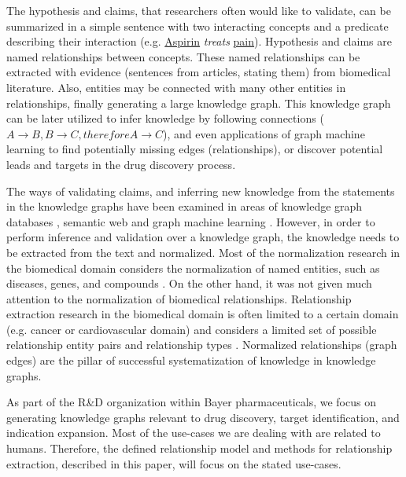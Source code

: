 \documentclass[final,12pt,3p,times,twocolumn,authoryear]{elsarticle}
\begin{document}
The hypothesis and claims, that researchers often would like to validate, can be summarized in a simple sentence with two interacting concepts and a predicate describing their interaction (e.g. \underline{Aspirin} \textit{treats} \underline{pain}). Hypothesis and claims are named relationships between concepts. These named relationships can be extracted with evidence (sentences from articles, stating them) from biomedical literature. Also, entities may be connected with many other entities in relationships, finally generating a large knowledge graph. This knowledge graph can be later utilized to infer knowledge by following connections ($A \rightarrow B, B \rightarrow C, therefore   A \rightarrow C$), and even applications of graph machine learning to find potentially missing edges (relationships), or discover potential leads and targets in the drug discovery process. 

The ways of validating claims, and inferring new knowledge from the statements in the knowledge graphs have been examined in areas of knowledge graph databases \citep{messina2017biograkn,miller2013graph}, semantic web \citep{mcguinness2004owl,parsia2004pellet,sirin2007pellet,shearer2008hermit} and graph machine learning \citep{scarselli2008graph,velivckovic2017graph,qu2019gmnn}. However, in order to perform inference and validation over a knowledge graph, the knowledge needs to be extracted from the text and normalized. Most of the normalization research in the biomedical domain considers the normalization of named entities, such as diseases, genes, and compounds \citep{cho2017method,ji2020bert,zhou2020knowledge}. On the other hand, it was not given much attention to the normalization of biomedical relationships. Relationship extraction research in the biomedical domain is often limited to a certain domain (e.g. cancer or cardiovascular domain) and considers a limited set of possible relationship entity pairs and relationship types \citep{rindflesch1999edgar,yang2021mining}. Normalized relationships (graph edges) are the pillar of successful systematization of knowledge in knowledge graphs.

As part of the R\&D organization within Bayer pharmaceuticals, we focus on generating knowledge graphs relevant to drug discovery, target identification, and indication expansion. Most of the use-cases we are dealing with are related to humans. Therefore, the defined relationship model and methods for relationship extraction, described in this paper, will focus on the stated use-cases.    
\end{document}
